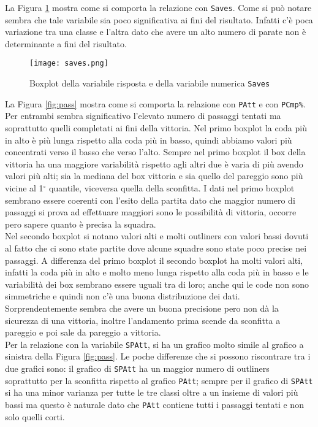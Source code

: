 La Figura \ref{fig:saves} mostra come si comporta la relazione con \texttt{Saves}. Come si può notare sembra che tale variabile sia poco significativa ai fini del risultato. Infatti c'è poca variazione tra una classe e l'altra dato che avere un alto numero di parate non è determinante a fini del risultato.\\

\begin{figure}[htbp]
	\begin{center}
		\texttt{[image: saves.png]}
		\caption{Boxplot della variabile risposta e della variabile numerica \texttt{Saves} } \label{fig:saves}
	\end{center}
\end{figure}

La Figura \ref{fig:pass} mostra come si comporta la relazione con \texttt{PAtt} e con \texttt{PCmp\%}. Per entrambi sembra significativo l'elevato numero di passaggi tentati ma soprattutto quelli completati ai fini della vittoria. Nel primo boxplot la coda più in alto è più lunga rispetto alla coda più in basso, quindi abbiamo valori più concentrati verso il basso che verso l'alto. Sempre nel primo boxplot il box della vittoria ha una maggiore variabilità rispetto agli altri due è varia di più avendo valori più alti; sia la mediana del box vittoria e sia quello del pareggio sono più vicine al 1$^{\circ}$ quantile, viceversa quella della sconfitta. I dati nel primo boxplot sembrano essere coerenti con l'esito della partita dato che maggior numero di passaggi si prova ad effettuare maggiori sono le possibilità di vittoria, occorre pero sapere quanto è precisa la squadra.\\

Nel secondo boxplot si notano valori alti e molti outliners con valori bassi dovuti al fatto che ci sono state partite dove alcune squadre sono state poco precise nei passaggi. A differenza del primo boxplot il secondo boxplot ha molti valori alti, infatti la coda più in alto e molto meno lunga rispetto alla coda più in basso e le variabilità dei box sembrano essere uguali tra di loro; anche qui le code non sono simmetriche e quindi non c'è una buona distribuzione dei dati. Sorprendentemente sembra che avere un buona precisione pero non dà la sicurezza di una vittoria, inoltre l'andamento prima scende da sconfitta a pareggio e poi sale da pareggio a vittoria.\\

Per la relazione con la variabile \texttt{SPAtt}, si ha un grafico molto simile al grafico a sinistra della Figura \ref{fig:pass}. Le poche differenze che si possono riscontrare tra i due grafici sono: il grafico di \texttt{SPAtt} ha un maggior numero di outliners soprattutto per la sconfitta rispetto al grafico \texttt{PAtt}; sempre per il grafico di \texttt{SPAtt} si ha una minor varianza per tutte le tre classi oltre a un insieme di valori più bassi ma questo è naturale dato che \texttt{PAtt} contiene tutti i passaggi tentati e non solo quelli corti.\\

